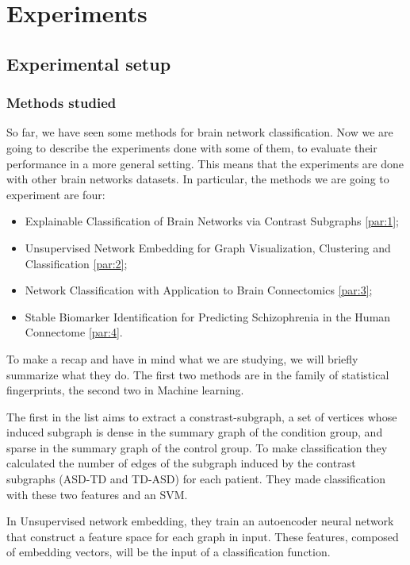 \chapter{Experiments}
\label{chap:3}
\section{Experimental setup}
\subsection{Methods studied}
So far, we have seen some methods for brain network classification. Now we are going to describe the experiments done with some of them, to evaluate their performance in a more general setting. This means that the experiments are done with other brain networks datasets. In particular, the methods we are going to experiment are four:

\begin{itemize}
	\item Explainable Classification of Brain Networks via Contrast Subgraphs \ref{par:1};
	\item Unsupervised Network Embedding for Graph Visualization, Clustering and Classification \ref{par:2};
	\item Network Classification with Application to Brain Connectomics \ref{par:3};
	\item Stable Biomarker Identification for Predicting Schizophrenia in the Human Connectome \ref{par:4}.
\end{itemize}
To make a recap and have in mind what we are studying, we will briefly summarize what they do. The first two methods are in the family of statistical fingerprints, the second two in Machine learning. 
\vspace{0.5cm}

The first in the list aims to extract a constrast-subgraph, a set of vertices whose induced subgraph is dense in the summary graph of the condition group, and sparse in the summary graph of the control group. To make classification they calculated the number of edges of the subgraph induced by the contrast subgraphs (ASD-TD and TD-ASD) for each patient. They made classification with these two features and an SVM.
\vspace{0.5cm}

In Unsupervised network embedding, they train an autoencoder neural network that construct a feature space for each graph in input. These features, composed of embedding vectors, will be the input of a classification function. 
\vspace{0.5cm}

